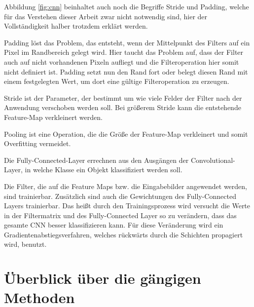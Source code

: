 Abbildung \ref{fig:cnn} beinhaltet auch noch die Begriffe Stride und Padding, welche für das Verstehen dieser Arbeit zwar nicht notwendig sind, hier der Vollständigkeit halber trotzdem erklärt werden. 

Padding löst das Problem, das entsteht, wenn der Mittelpunkt des Filters auf ein Pixel im Randbereich gelegt wird. Hier taucht das Problem auf, dass der Filter auch auf nicht vorhandenen Pixeln aufliegt und die Filteroperation hier somit nicht definiert ist. Padding setzt nun den Rand fort oder belegt diesen Rand mit einem festgelegten Wert, um dort eine gültige Filteroperation zu erzeugen. 

Stride ist der Parameter, der bestimmt um wie viele Felder der Filter nach der Anwendung verschoben werden soll. Bei größerem Stride kann die entstehende Feature-Map verkleinert werden.

Pooling ist eine Operation, die die Größe der Feature-Map verkleinert und somit Overfitting vermeidet.

Die Fully-Connected-Layer errechnen aus den Ausgängen der Convolutional-Layer, in welche Klasse ein Objekt klassifiziert werden soll.  

Die Filter, die auf die Feature Maps bzw. die Eingabebilder angewendet werden, sind trainierbar. Zusätzlich sind auch die Gewichtungen des Fully-Connected Layers trainierbar. Das heißt durch den Trainingsprozess wird versucht die Werte in der Filtermatrix und des Fully-Connected Layer so zu verändern, dass das gesamte CNN besser klassifizieren kann. Für diese Veränderung wird ein Gradientenabstiegsverfahren, welches rückwärts durch die Schichten propagiert wird, benutzt.



\section{Überblick über die gängigen Methoden}
